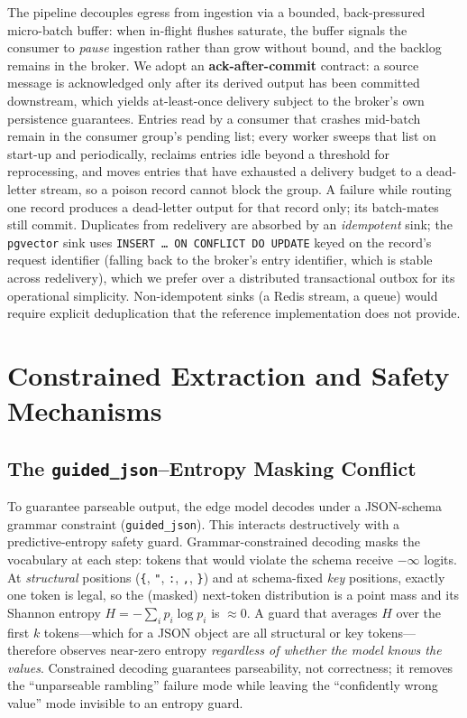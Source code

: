 \documentclass[conference]{IEEEtran}
\begin{document}
The pipeline decouples egress from ingestion via a bounded, back-pressured micro-batch buffer: when in-flight flushes saturate, the buffer signals the consumer to \emph{pause} ingestion rather than grow without bound, and the backlog remains in the broker. We adopt an \textbf{ack-after-commit} contract: a source message is acknowledged only after its derived output has been committed downstream, which yields at-least-once delivery subject to the broker's own persistence guarantees. Entries read by a consumer that crashes mid-batch remain in the consumer group's pending list; every worker sweeps that list on start-up and periodically, reclaims entries idle beyond a threshold for reprocessing, and moves entries that have exhausted a delivery budget to a dead-letter stream, so a poison record cannot block the group. A failure while routing one record produces a dead-letter output for that record only; its batch-mates still commit. Duplicates from redelivery are absorbed by an \emph{idempotent} sink; the \texttt{pgvector} sink uses \texttt{INSERT \ldots\ ON CONFLICT DO UPDATE} keyed on the record's request identifier (falling back to the broker's entry identifier, which is stable across redelivery), which we prefer over a distributed transactional outbox for its operational simplicity. Non-idempotent sinks (a Redis stream, a queue) would require explicit deduplication that the reference implementation does not provide.

\section{Constrained Extraction and Safety Mechanisms}

\subsection{The \texttt{guided\_json}--Entropy Masking Conflict}
\label{sec:conflict}

To guarantee parseable output, the edge model decodes under a JSON-schema grammar constraint (\texttt{guided\_json}). This interacts destructively with a predictive-entropy safety guard. Grammar-constrained decoding masks the vocabulary at each step: tokens that would violate the schema receive $-\infty$ logits. At \emph{structural} positions (\texttt{\{}, \texttt{"}, \texttt{:}, \texttt{,}, \texttt{\}}) and at schema-fixed \emph{key} positions, exactly one token is legal, so the (masked) next-token distribution is a point mass and its Shannon entropy $H=-\sum_i p_i\log p_i$ is $\approx 0$. A guard that averages $H$ over the first $k$ tokens---which for a JSON object are all structural or key tokens---therefore observes near-zero entropy \emph{regardless of whether the model knows the values}. Constrained decoding guarantees parseability, not correctness; it removes the ``unparseable rambling'' failure mode while leaving the ``confidently wrong value'' mode invisible to an entropy guard.
\end{document}
